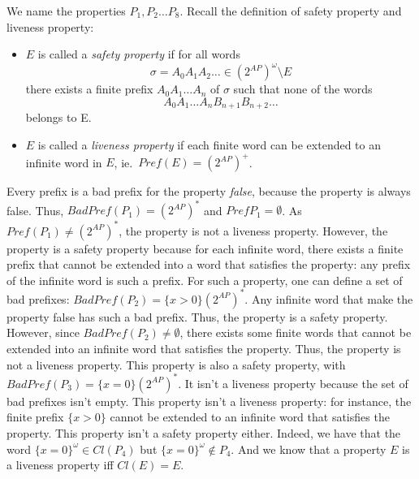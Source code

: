\documentclass[11pt,a4paper]{article}
\newcommand\badp{\mathit{BadPref}}
\newcommand\pref{\mathit{Pref}}
\newcommand\twoap{2^{AP}}
\renewcommand\star{^*}
\newcommand\cl{\mathit{Cl}}
\begin{document}
\begin{Answer}


We name the properties $P_1, P_2\dots P_8$.
Recall the definition of safety property and liveness property:
\begin{itemize}
	\item $E$ is called a \emph{safety property} if for all words
		$$\sigma = A_0A_1A_2\dots\in{(\twoap)}^\omega\setminus E$$
		there exists a finite prefix $A_0A_1\dots A_n$ of $\sigma$ such that none of the words $$A_0A_1\dots A_nB_{n+1}B_{n+2}\dots$$ belongs to E. %
	\item $E$ is called a \emph{liveness property} if each finite word can be extended to an infinite word in $E$, ie.\ $\pref(E) = {(\twoap)}^+$.
\end{itemize}
  \Question%
Every prefix is a bad prefix for the property \textit{false}, because the property is always false. Thus, $\badp(P_1) = (\twoap)\star$ and $\pref{P_1} = \emptyset$. As $\pref(P_1)\neq (\twoap)\star$, the property is not a liveness property. However, the property is a safety property because for each infinite word, there exists a finite prefix that cannot be extended into a word that satisfies the property: any prefix of the infinite word is such a prefix. %
  \Question%
For such a property, one can define a set of bad prefixes: $\badp(P_2) = \{x > 0\}(\twoap)\star$. Any infinite word that make the property false has such a bad prefix. Thus, the property is a safety property. However, since $\badp(P_2)\neq\emptyset$, there exists some finite words that cannot be extended into an infinite word that satisfies the property. Thus, the property is not a liveness property.
  \Question%
This property is also a safety property, with $\badp(P_3) = \{x=0\}(\twoap)\star$. It isn't a liveness property because the set of bad prefixes isn't empty.
  \Question%
This property isn't a liveness property: for instance, the finite prefix $\{x>0\}$ cannot be extended to an infinite word that satisfies the property.
This property isn't a safety property either. Indeed, we have that the word ${\{x=0\}}^\omega\in\cl(P_4)$ but ${\{x=0\}}^\omega\not\in P_4$. And we know that a property $E$ is a liveness property iff $\cl(E)=E$.
  \Question%

\end{Answer}
\end{document}
